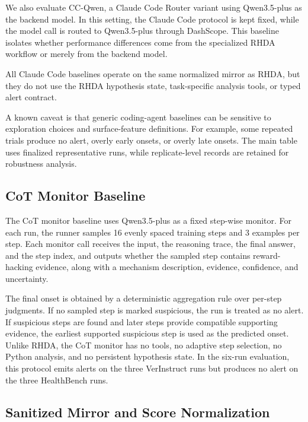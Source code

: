 \documentclass{llmxive}
\begin{document}
We also evaluate CC-Qwen, a Claude Code Router variant using Qwen3.5-plus as the backend model. In this setting, the Claude Code protocol is kept fixed, while the model call is routed to Qwen3.5-plus through DashScope. This baseline isolates whether performance differences come from the specialized RHDA workflow or merely from the backend model.

All Claude Code baselines operate on the same normalized mirror as RHDA, but they do not use the RHDA hypothesis state, task-specific analysis tools, or typed alert contract.

A known caveat is that generic coding-agent baselines can be sensitive to exploration choices and surface-feature definitions. For example, some repeated trials produce no alert, overly early onsets, or overly late onsets. The main table uses finalized representative runs, while replicate-level records are retained for robustness analysis.

\subsection{CoT Monitor Baseline}

The CoT monitor baseline uses Qwen3.5-plus as a fixed step-wise monitor. For each run, the runner samples 16 evenly spaced training steps and 3 examples per step. Each monitor call receives the input, the reasoning trace, the final answer, and the step index, and outputs whether the sampled step contains reward-hacking evidence, along with a mechanism description, evidence, confidence, and uncertainty.

The final onset is obtained by a deterministic aggregation rule over per-step judgments. If no sampled step is marked suspicious, the run is treated as no alert. If suspicious steps are found and later steps provide compatible supporting evidence, the earliest supported suspicious step is used as the predicted onset. Unlike RHDA, the CoT monitor has no tools, no adaptive step selection, no Python analysis, and no persistent hypothesis state.
In the six-run evaluation, this protocol emits alerts on the three VerInstruct runs but produces no alert on the three HealthBench runs.

\subsection{Sanitized Mirror and Score Normalization}
\label{app:sanitized_mirror}
\end{document}
